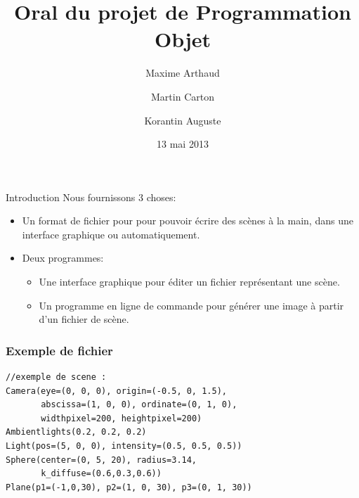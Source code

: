 \documentclass{beamer}
\title{Oral du projet de Programmation Objet}
\author{Maxime Arthaud \and Martin Carton \and Korantin Auguste}
\date{13 mai 2013}
\begin{document}
  \begin{frame}
    \titlepage
  \end{frame}

  \begin{frame}{Introduction}
    Nous fournissons 3 choses:
    \begin{itemize}
      \item Un format de fichier pour pour pouvoir écrire des scènes à la main,
        dans une interface graphique ou automatiquement.

      \item
        Deux programmes:
        \begin{itemize}
          \item Une interface graphique pour éditer un fichier représentant une
            scène.
          \item Un programme en ligne de commande pour générer une image à
            partir d'un fichier de scène.
        \end{itemize}
    \end{itemize}
  \end{frame}

\begin{frame}[fragile]
\frametitle{Exemple de fichier}

\begin{lstlisting}
//exemple de scene :
Camera(eye=(0, 0, 0), origin=(-0.5, 0, 1.5),
       abscissa=(1, 0, 0), ordinate=(0, 1, 0),
       widthpixel=200, heightpixel=200)
Ambientlights(0.2, 0.2, 0.2)
Light(pos=(5, 0, 0), intensity=(0.5, 0.5, 0.5))
Sphere(center=(0, 5, 20), radius=3.14,
       k_diffuse=(0.6,0.3,0.6))
Plane(p1=(-1,0,30), p2=(1, 0, 30), p3=(0, 1, 30))
\end{lstlisting}
\end{frame}
\end{document}
